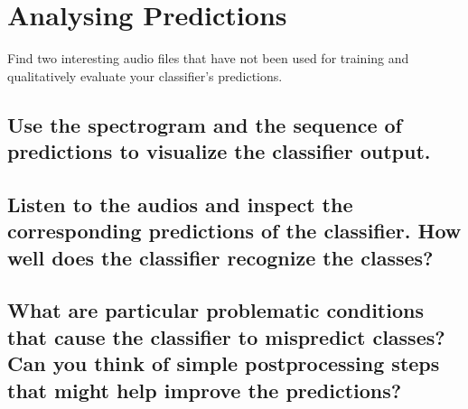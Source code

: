 
\section{Analysing Predictions}
\label{sec:Analysing Predictions}



Find two interesting audio files that have not been used for training and qualitatively evaluate your classifier’s predictions. 



\subsection{Use the spectrogram and the sequence of predictions to visualize the classifier output. }
\label{sec:Analysing Predictions:a}






\subsection{Listen to the audios and inspect the corresponding predictions of the classifier. How well does the classifier recognize the classes?}
\label{sec:Analysing Predictions:b}



\subsection{What are particular problematic conditions that cause the classifier to mispredict classes? Can you think of simple postprocessing steps that might help improve the predictions?}
\label{sec:Analysing Predictions:c}





